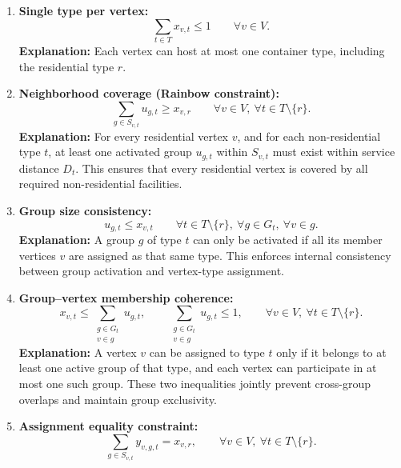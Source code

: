 \documentclass[12pt,a4paper]{article}
\begin{document}
\begin{enumerate}
    \item \textbf{Single type per vertex:}
    \[
    \sum_{t \in T} x_{v,t} \le 1 
    \qquad \forall v \in V.
    \]
    \textbf{Explanation:}  
    Each vertex can host at most one container type, including the residential type $r$.

    \vspace{0.7em}


    \item \textbf{Neighborhood coverage (Rainbow constraint):}
    \[
    \sum_{g \in S_{v,t}} u_{g,t} \ge x_{v,r}
    \qquad 
    \forall v \in V,\ 
    \forall t \in T \setminus \{r\}.
    \]
    \textbf{Explanation:}  
    For every residential vertex $v$, and for each non-residential type $t$,  
    at least one activated group $u_{g,t}$ within $S_{v,t}$ must exist within service distance $D_t$.  
    This ensures that every residential vertex is covered by all required non-residential facilities.

    \vspace{0.7em}

    \item \textbf{Group size consistency:}
    \[
    u_{g,t} \le x_{v,t}
    \qquad 
    \forall t \in T \setminus \{r\},\ 
    \forall g \in G_t,\ 
    \forall v \in g.
    \]
    \textbf{Explanation:}  
    A group $g$ of type $t$ can only be activated if all its member vertices $v$ are assigned as that same type.  
    This enforces internal consistency between group activation and vertex-type assignment.

    \vspace{0.7em}

    \item \textbf{Group–vertex membership coherence:}
    \[
    x_{v,t} \le 
    \sum_{\substack{g \in G_t \\ v \in g}} u_{g,t},
    \qquad
    \sum_{\substack{g \in G_t \\ v \in g}} u_{g,t} \le 1,
    \qquad
    \forall v \in V,\ 
    \forall t \in T \setminus \{r\}.
    \]
    \textbf{Explanation:}  
    A vertex $v$ can be assigned to type $t$ only if it belongs to at least one active group of that type,  
    and each vertex can participate in at most one such group.  
    These two inequalities jointly prevent cross-group overlaps and maintain group exclusivity.

\item \textbf{Assignment equality constraint:}
\[
\sum_{g \in S_{v,t}} y_{v,g,t} = x_{v,r},
\qquad
\forall v \in V,\ \forall t \in T \setminus \{r\}.
\]


\end{enumerate}
\end{document}
